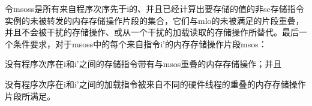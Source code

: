 令msoss是所有来自程序次序先于i的、并且已经计算出要存储的值的非sc存储指令实例的未被转发的内存存储操作片段的集合，它们与mlo的未被满足的片段重叠，并且不会被干扰的存储操作、或从一个干扰的加载读取的存储操作所替代。最后一个条件要求，对于msoss中的每个来自指令i’的内存存储操作片段msos：
\begin{tightlist}
\item 没有程序次序在i和i’之间的存储指令带有与msos重叠的内存存储操作；并且 %
\item 没有程序次序在i和i’之间的加载指令被来自不同的硬件线程的重叠的内存存储操作片段所满足。  %
\end{tightlist}


